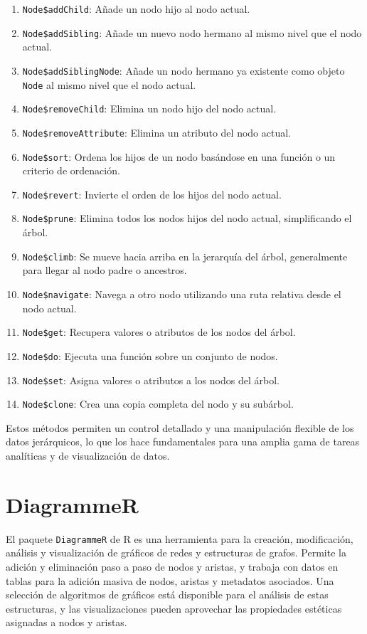 \documentclass[12pt]{report}\usepackage[]{graphicx}\usepackage[dvipsnames]{xcolor}
\begin{document}
			 	\begin{enumerate}
			 		\item \texttt{Node\$addChild}: Añade un nodo hijo al nodo actual.
			 		\item \texttt{Node\$addSibling}: Añade un nuevo nodo hermano al mismo nivel que el nodo actual.
			 		\item \texttt{Node\$addSiblingNode}: Añade un nodo hermano ya existente como objeto \texttt{Node} al mismo nivel que el nodo actual.
			 		\item \texttt{Node\$removeChild}: Elimina un nodo hijo del nodo actual.
			 		\item \texttt{Node\$removeAttribute}: Elimina un atributo del nodo actual.
			 		\item \texttt{Node\$sort}: Ordena los hijos de un nodo basándose en una función o un criterio de ordenación.
			 		\item \texttt{Node\$revert}: Invierte el orden de los hijos del nodo actual.
			 		\item \texttt{Node\$prune}: Elimina todos los nodos hijos del nodo actual, simplificando el árbol.
			 		\item \texttt{Node\$climb}: Se mueve hacia arriba en la jerarquía del árbol, generalmente para llegar al nodo padre o ancestros.
			 		\item \texttt{Node\$navigate}: Navega a otro nodo utilizando una ruta relativa desde el nodo actual.
			 		\item \texttt{Node\$get}: Recupera valores o atributos de los nodos del árbol.
			 		\item \texttt{Node\$do}: Ejecuta una función sobre un conjunto de nodos.
			 		\item \texttt{Node\$set}: Asigna valores o atributos a los nodos del árbol.
			 		\item \texttt{Node\$clone}: Crea una copia completa del nodo y su subárbol.
			 	\end{enumerate}
			 	
			 	Estos métodos permiten un control detallado y una manipulación flexible de los datos jerárquicos, lo que los hace fundamentales para una amplia gama de tareas analíticas y de visualización de datos.
 	
 		\section{DiagrammeR}
 	
		 	El paquete \texttt{DiagrammeR} de R es una herramienta para la creación, modificación, análisis y visualización de gráficos de redes y estructuras de grafos. Permite la adición y eliminación paso a paso de nodos y aristas, y trabaja con datos en tablas para la adición masiva de nodos, aristas y metadatos asociados. Una selección de algoritmos de gráficos está disponible para el análisis de estas estructuras, y las visualizaciones pueden aprovechar las propiedades estéticas asignadas a nodos y aristas.\\
		 	
\end{document}
